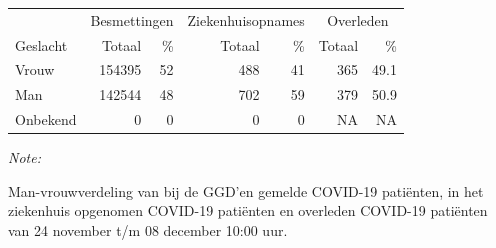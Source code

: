 \documentclass[
  english,
  man,floatsintext]{apa6}
\begin{document}
\newpage

\begin{table}
\centering\begingroup\fontsize{11}{13}\selectfont

\begin{threeparttable}
\begin{tabular}{lrrrrrr}
\toprule
\multicolumn{1}{c}{ } & \multicolumn{2}{c}{Besmettingen} & \multicolumn{2}{c}{Ziekenhuisopnames} & \multicolumn{2}{c}{Overleden} \\
\cmidrule(l{3pt}r{3pt}){2-3} \cmidrule(l{3pt}r{3pt}){4-5} \cmidrule(l{3pt}r{3pt}){6-7}
Geslacht & Totaal & \% & Totaal & \% & Totaal & \%\\
\midrule
Vrouw & 154395 & 52 & 488 & 41 & 365 & 49.1\\
Man & 142544 & 48 & 702 & 59 & 379 & 50.9\\
Onbekend & 0 & 0 & 0 & 0 & NA & NA\\
\bottomrule
\end{tabular}
\begin{tablenotes}
\item \textit{Note: } 
\item Man-vrouwverdeling van bij de GGD’en gemelde COVID-19 patiënten, in het ziekenhuis opgenomen COVID-19 patiënten en overleden COVID-19 patiënten van 24 november t/m 08 december 10:00 uur.
\end{tablenotes}
\end{threeparttable}
\endgroup{}
\end{table}
\newpage
\end{document}
